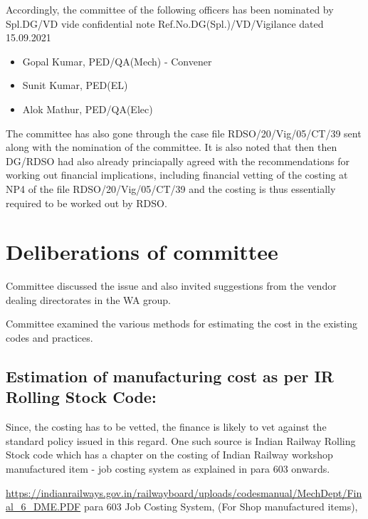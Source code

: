 \documentclass[
  10pt,
  twoside]{article}
\providecommand{\tightlist}{%
  \setlength{\itemsep}{0pt}\setlength{\parskip}{0pt}}
\begin{document}
Accordingly, the committee of the following officers has been nominated
by Spl.DG/VD vide confidential note Ref.No.DG(Spl.)/VD/Vigilance dated
15.09.2021

\begin{itemize}
\tightlist
\item
  Gopal Kumar, PED/QA(Mech) - Convener
\item
  Sunit Kumar, PED(EL)
\item
  Alok Mathur, PED/QA(Elec)
\end{itemize}

The committee has also gone through the case file RDSO/20/Vig/05/CT/39
sent along with the nomination of the committee. It is also noted that
then then DG/RDSO had also already princiapally agreed with the
recommendations for working out financial implications, including
financial vetting of the costing at NP4 of the file RDSO/20/Vig/05/CT/39
and the costing is thus essentially required to be worked out by RDSO.

\hypertarget{deliberations-of-committee}{%
\section{Deliberations of committee}\label{deliberations-of-committee}}

Committee discussed the issue and also invited suggestions from the
vendor dealing directorates in the WA group.

Committee examined the various methods for estimating the cost in the
existing codes and practices.

\hypertarget{estimation-of-manufacturing-cost-as-per-ir-rolling-stock-code}{%
\subsection{Estimation of manufacturing cost as per IR Rolling Stock
Code:}\label{estimation-of-manufacturing-cost-as-per-ir-rolling-stock-code}}

Since, the costing has to be vetted, the finance is likely to vet
against the standard policy issued in this regard. One such source is
Indian Railway Rolling Stock code which has a chapter on the costing of
Indian Railway workshop manufactured item - job costing system as
explained in para 603 onwards.

\url{https://indianrailways.gov.in/railwayboard/uploads/codesmanual/MechDept/Final_6_DME.PDF}
para 603 Job Costing System, (For Shop manufactured items),
\end{document}
